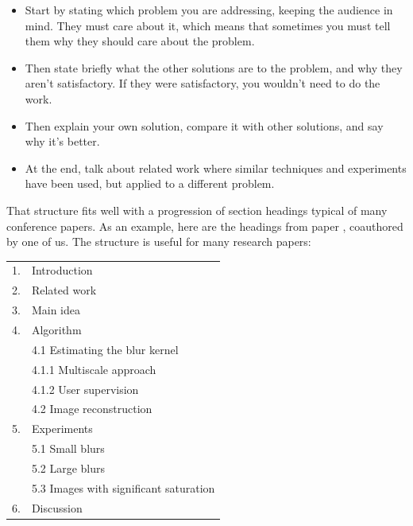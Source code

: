 \begin{itemize}
    \item Start by stating which problem you are addressing, keeping the
          audience in mind.  They must care about it, which means that sometimes
          you must tell them why they should care about the problem.

    \item Then state briefly what the other solutions are to the problem, and why they aren't satisfactory.  If they were satisfactory, you wouldn't need to  do the work.

    \item Then explain your own solution, compare it with other solutions, and say why it's better.

    \item At the end, talk about related work where similar techniques and experiments have been used, but applied to a different problem.
\end{itemize}

That structure fits well with a progression of section headings typical of  many conference papers.  As an example, here are the headings from paper \cite{Fergus2006}, coauthored by one of us.  The structure is useful for many research papers:

\begin{tabular}{ll}
    1. & Introduction                           \\
    2. & Related work                           \\
    3. & Main idea                              \\
    4. & Algorithm                              \\
       & 4.1 Estimating the blur kernel         \\
       & \hspace{1cm} 4.1.1 Multiscale approach \\
       & \hspace{1cm} 4.1.2 User supervision    \\
       & 4.2 Image reconstruction               \\
    5. & Experiments                            \\
       & 5.1 Small blurs                        \\
       & 5.2 Large blurs                        \\
       & 5.3 Images with significant saturation \\
    6. & Discussion                             \\
\end{tabular}





